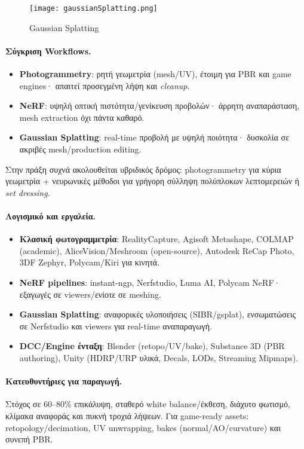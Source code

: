 \begin{figure}[H]
    \centering
    \texttt{[image: gaussianSplatting.png]}
    \caption{Gaussian Splatting}
    \label{fig:placeholder}
\end{figure}



\paragraph{Σύγκριση Workflows.}
\begin{itemize}
  \item \textbf{Photogrammetry}: ρητή γεωμετρία (mesh/UV), έτοιμη για PBR και game engines· απαιτεί προσεγμένη λήψη και \emph{cleanup}.
  \item \textbf{NeRF}: υψηλή οπτική πιστότητα/γενίκευση προβολών· άρρητη αναπαράσταση, mesh extraction όχι πάντα καθαρό.
  \item \textbf{Gaussian Splatting}: real-time προβολή με υψηλή ποιότητα· δυσκολία σε ακριβές mesh/production editing.
\end{itemize}
Στην πράξη συχνά ακολουθείται υβριδικός δρόμος: photogrammetry για κύρια γεωμετρία + νευρωνικές μέθοδοι για γρήγορη σύλληψη πολύπλοκων λεπτομερειών ή \emph{set dressing}.

\paragraph{Λογισμικό και εργαλεία.}
\begin{itemize}
  \item \textbf{Κλασική φωτογραμμετρία}: RealityCapture, Agisoft Metashape, COLMAP (academic), AliceVision/Meshroom (open-source), Autodesk ReCap Photo, 3DF Zephyr, Polycam/Kiri για κινητά.
  \item \textbf{NeRF pipelines}: instant-ngp, Nerfstudio, Luma AI, Polycam NeRF· εξαγωγές σε viewers/ενίοτε σε meshing.
  \item \textbf{Gaussian Splatting}: αναφορικές υλοποιήσεις (SIBR/gsplat), ενσωματώσεις σε Nerfstudio και viewers για real-time αναπαραγωγή.
  \item \textbf{DCC/Engine ένταξη}: Blender (retopo/UV/bake), Substance 3D (PBR authoring), Unity (HDRP/URP υλικά, Decals, LODs, Streaming Mipmaps).
\end{itemize}

\paragraph{Κατευθυντήριες για παραγωγή.}
Στόχος σε 60–80\% επικάλυψη, σταθερό white balance/έκθεση, διάχυτο φωτισμό, κλίμακα αναφοράς και πυκνή τροχιά λήψεων. Για game-ready assets: retopology/decimation, UV unwrapping, bakes (normal/AO/curvature) και συνεπή PBR.

